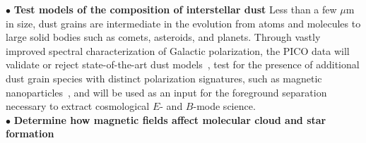 \documentclass[PICOAPC.tex]{subfiles}
\begin{document}
%
$\bullet$ {\bf Test models of the composition of interstellar dust} \hspace{0.1in}  
Less than a few $\mu$m in size, dust grains are intermediate in the evolution from atoms and molecules to large solid bodies such as comets, asteroids, and planets. Through vastly improved spectral characterization of Galactic polarization, the PICO data will 
validate or reject state-of-the-art dust models~\citep[e.g.][]{Draine2009,Guillet2018,hensely_swp}, test for the presence of additional dust grain species with distinct polarization signatures, such as magnetic nanoparticles~\citep{Draine2013}, and will be used as an input for the foreground separation necessary to extract cosmological $E$- and $B$-mode science. \\
$\bullet$ {\bf Determine how magnetic fields affect molecular cloud and star formation} \hspace{0.1in}
\end{document}
